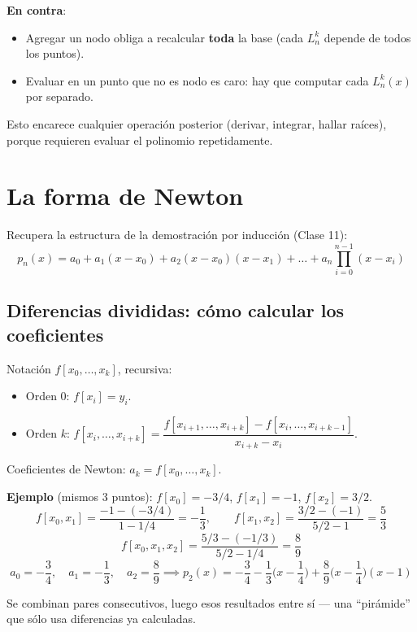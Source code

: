 \documentclass[12pt,a4paper]{article}
\begin{document}
\textbf{En contra}:
\begin{itemize}
  \item Agregar un nodo obliga a recalcular \textbf{toda} la base (cada
  $L_n^k$ depende de todos los puntos).
  \item Evaluar en un punto que no es nodo es caro: hay que computar cada
  $L_n^k(x)$ por separado.
\end{itemize}

\begin{warnbox}
Esto encarece cualquier operación posterior (derivar, integrar, hallar
raíces), porque requieren evaluar el polinomio repetidamente.
\end{warnbox}

\section{La forma de Newton}

Recupera la estructura de la demostración por inducción (Clase 11):
$$p_n(x) = a_0 + a_1(x-x_0) + a_2(x-x_0)(x-x_1) + \dots + a_n\prod_{i=0}^{n-1}(x-x_i)$$

\subsection{Diferencias divididas: cómo calcular los coeficientes}

Notación $f[x_0,\dots,x_k]$, recursiva:
\begin{itemize}
  \item Orden 0: $f[x_i] = y_i$.
  \item Orden $k$: $f[x_i,\dots,x_{i+k}] = \dfrac{f[x_{i+1},\dots,x_{i+k}] - f[x_i,\dots,x_{i+k-1}]}{x_{i+k}-x_i}$.
\end{itemize}

Coeficientes de Newton: $a_k = f[x_0,\dots,x_k]$.

\textbf{Ejemplo} (mismos 3 puntos): $f[x_0]=-3/4$, $f[x_1]=-1$,
$f[x_2]=3/2$.
$$f[x_0,x_1] = \frac{-1-(-3/4)}{1-1/4} = -\frac13, \qquad f[x_1,x_2] = \frac{3/2-(-1)}{5/2-1} = \frac53$$
$$f[x_0,x_1,x_2] = \frac{5/3-(-1/3)}{5/2-1/4} = \frac{8}{9}$$
$$a_0=-\frac34,\quad a_1=-\frac13,\quad a_2=\frac89 \implies p_2(x) = -\frac34 -\frac13\Big(x-\frac14\Big) + \frac89\Big(x-\frac14\Big)(x-1)$$

\begin{notebox}
Se combinan pares consecutivos, luego esos resultados entre sí — una
``pirámide'' que sólo usa diferencias ya calculadas.
\end{notebox}
\end{document}

